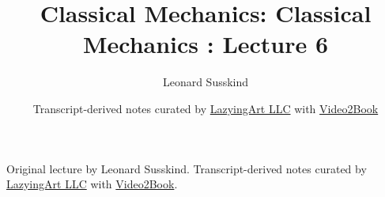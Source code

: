 \documentclass[11pt,oneside]{book}
\begin{document}
\frontmatter
\title{Classical Mechanics: Classical Mechanics : Lecture 6}
\author{Leonard Susskind}
\date{Transcript-derived notes curated by \href{https://lazying.art}{LazyingArt LLC} with \href{https://github.com/lachlanchen/Video2Book}{Video2Book}}
\maketitle
\begin{center}
\small Original lecture by Leonard Susskind. Transcript-derived notes curated by \href{https://lazying.art}{LazyingArt LLC} with \href{https://github.com/lachlanchen/Video2Book}{Video2Book}.
\end{center}
\clearpage
\mainmatter

\end{document}
